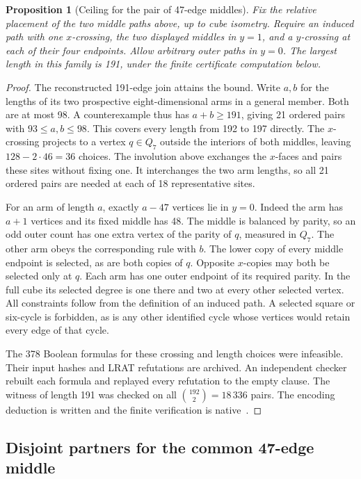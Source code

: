 \documentclass[11pt,a4paper]{article}
\newtheorem{proposition}[theorem]{Proposition}
\theoremstyle{definition}
\theoremstyle{remark}
\begin{document}
\begin{proposition}[Ceiling for the pair of 47-edge middles]
Fix the relative placement of the two middle paths above, up to cube
isometry. Require an induced path with one $x$-crossing, the two
displayed middles in $y=1$, and a $y$-crossing at each of their four
endpoints. Allow arbitrary outer paths in $y=0$. The largest length
in this family is 191, under the finite certificate computation below.
\end{proposition}
\begin{proof}
The reconstructed 191-edge join attains the bound. Write $a,b$ for
the lengths of its two prospective eight-dimensional arms in a general
member. Both are at most 98. A counterexample thus has $a+b\ge191$,
giving 21 ordered pairs with $93\le a,b\le98$. This covers every
length from 192 to 197 directly. The $x$-crossing projects to a
vertex $q\in Q_7$ outside the interiors of both middles, leaving
$128-2\cdot46=36$ choices. The involution above exchanges the
$x$-faces and pairs these sites without fixing one. It interchanges
the two arm lengths, so all 21 ordered pairs are needed at each of
18 representative sites.

For an arm of length $a$, exactly $a-47$ vertices lie in $y=0$.
Indeed the arm has $a+1$ vertices and its fixed middle has 48.
The middle is balanced by parity, so an odd outer count has one
extra vertex of the parity of $q$, measured in $Q_7$. The other
arm obeys the corresponding rule with $b$. The lower copy of every
middle endpoint is selected, as are both copies of $q$.
Opposite $x$-copies may both be selected only at $q$.
Each arm has one outer endpoint of its required parity. In the full
cube its selected degree is one there and two at every other selected
vertex. All constraints follow from the definition of an induced path.
A selected square or six-cycle is forbidden, as is any other identified
cycle whose vertices would retain every edge of that cycle.

The 378 Boolean formulas for these crossing and length choices were
infeasible. Their input hashes and LRAT refutations are archived.
An independent checker rebuilt each formula and replayed every
refutation to the empty clause.
The witness of length 191 was checked on all $\binom{192}{2}=18\,336$
pairs. The encoding deduction is written and the finite verification
is native~\cite{q8parents246}.
\end{proof}

\subsection{Disjoint partners for the common 47-edge middle}\label{sec:middle247}
\end{document}
